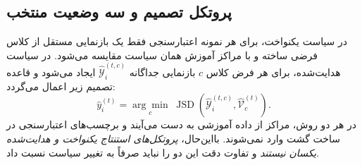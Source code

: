 \subsection{پروتکل تصمیم و سه وضعیت منتخب}
\label{subsec:ch4-center-observation-cases}
در سیاست یکنواخت، برای هر نمونه اعتبارسنجی فقط یک بازنمایی مستقل از کلاس فرضی ساخته و با مراکز آموزش همان سیاست مقایسه می‌شود. در سیاست هدایت‌شده، برای هر فرض کلاس $c$ بازنمایی جداگانه $\widehat{\mathscr Y}_i^{(t,c)}$ ایجاد می‌شود و قاعده تصمیم زیر اعمال می‌گردد:
\begin{equation}\label{eq:ch4-center-observation-decision}
\widehat y_i^{(t)}=
\underset{c}{\arg\min}\;
\operatorname{JSD}\left(
\widehat{\mathscr Y}_i^{(t,c)},\widehat{\mathcal V}_c^{(t)}\right).
\end{equation}
در هر دو روش، مراکز از داده آموزشی به دست می‌آیند و برچسب‌های اعتبارسنجی در ساخت گشت وارد نمی‌شوند. بااین‌حال، \emph{پروتکل‌های استنتاج یکنواخت و هدایت‌شده یکسان نیستند} و تفاوت دقت این دو را نباید صرفاً به تغییر سیاست نسبت داد.

